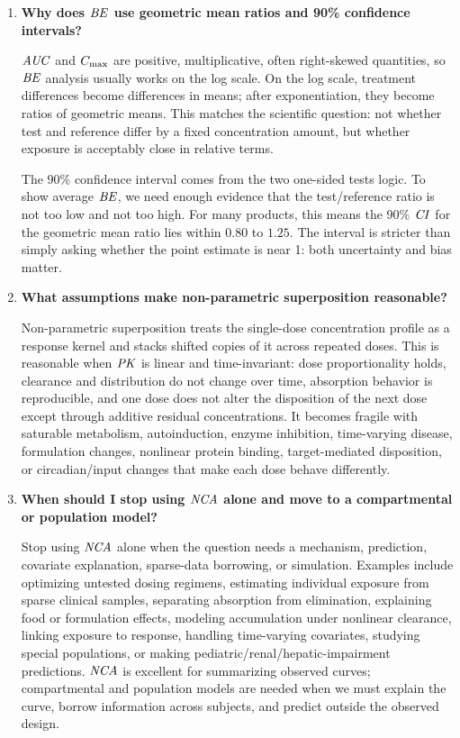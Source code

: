\documentclass[a4paper]{article}
\newcommand{\AUC}{\ensuremath{\pksym{AUC}}}
\newcommand{\Cmax}{\ensuremath{C_{\pklab{max}}}}
\newcommand{\PK}{\ensuremath{\pksym{PK}}}
\newcommand{\NCA}{\ensuremath{\pksym{NCA}}}
\newcommand{\BE}{\ensuremath{\pksym{BE}}}
\newcommand{\CI}{\ensuremath{\pksym{CI}}}
\begin{document}
\begin{enumerate}[leftmargin=2em]
  \item \textbf{Why does \BE{} use geometric mean ratios and 90\% confidence intervals?}

  \AUC{} and \Cmax{} are positive, multiplicative, often right-skewed quantities, so \BE{} analysis usually works on the log scale. On the log scale, treatment differences become differences in means; after exponentiation, they become ratios of geometric means. This matches the scientific question: not whether test and reference differ by a fixed concentration amount, but whether exposure is acceptably close in relative terms.

  The 90\% confidence interval comes from the two one-sided tests logic. To show average \BE{}, we need enough evidence that the test/reference ratio is not too low and not too high. For many products, this means the 90\% \CI{} for the geometric mean ratio lies within \(0.80\) to \(1.25\). The interval is stricter than simply asking whether the point estimate is near 1: both uncertainty and bias matter.

  \item \textbf{What assumptions make non-parametric superposition reasonable?}

  Non-parametric superposition treats the single-dose concentration profile as a response kernel and stacks shifted copies of it across repeated doses. This is reasonable when \PK{} is linear and time-invariant: dose proportionality holds, clearance and distribution do not change over time, absorption behavior is reproducible, and one dose does not alter the disposition of the next dose except through additive residual concentrations. It becomes fragile with saturable metabolism, autoinduction, enzyme inhibition, time-varying disease, formulation changes, nonlinear protein binding, target-mediated disposition, or circadian/input changes that make each dose behave differently.

  \item \textbf{When should I stop using \NCA{} alone and move to a compartmental or population model?}

  Stop using \NCA{} alone when the question needs a mechanism, prediction, covariate explanation, sparse-data borrowing, or simulation. Examples include optimizing untested dosing regimens, estimating individual exposure from sparse clinical samples, separating absorption from elimination, explaining food or formulation effects, modeling accumulation under nonlinear clearance, linking exposure to response, handling time-varying covariates, studying special populations, or making pediatric/renal/hepatic-impairment predictions. \NCA{} is excellent for summarizing observed curves; compartmental and population models are needed when we must explain the curve, borrow information across subjects, and predict outside the observed design.
\end{enumerate}



\end{document}
